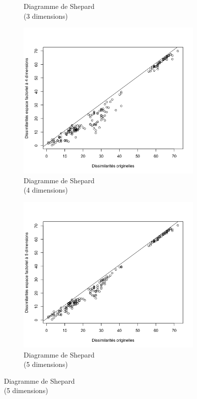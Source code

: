 \documentclass[a4paper,10pt]{report}
\begin{document}
\begin{figure}[H]
\begin{subfigure}[b]{0.25\linewidth}
		\caption{\scriptsize Diagramme de Shepard\\(3 dimensions)}
		\label{fig:1-mut-acp-aftd-diag-shepard-3-dim}
	\end{subfigure}%
	\begin{subfigure}[b]{0.25\linewidth}
		\centering
		\captionsetup{justification=centering}
		\includegraphics[width=1\linewidth]{img/1-mut-acp-aftd-diag-shepard-4-dim}
		\caption{\scriptsize Diagramme de Shepard\\(4 dimensions)}
		\label{fig:1-mut-acp-aftd-diag-shepard-4-dim}
	\end{subfigure}%
	\begin{subfigure}[b]{0.25\linewidth}
		\centering
		\captionsetup{justification=centering}
		\includegraphics[width=1\linewidth]{img/1-mut-acp-aftd-diag-shepard-5-dim}
		\caption{\scriptsize Diagramme de Shepard\\(5 dimensions)}
		\label{fig:1-mut-acp-aftd-diag-shepard-5-dim}
	\end{subfigure}%
	\label{fig:1-mut-acp-aftd-diag-shepard}%
\end{figure}
\end{document}
